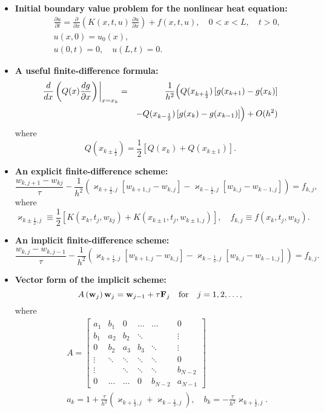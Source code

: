 \documentclass[12pt]{article}
\newcommand\pr{\partial}
\begin{document}
\begin{itemize}

\item \textbf{Initial boundary value problem for the nonlinear heat equation:}
\begin{eqnarray}
&&\frac{\pr u}{\pr t} =\frac{\pr }{\pr x}\left(K(x,t,u) \,
\frac{\pr u}{\pr x}\right)+f(x,t,u),  \quad 0<x< L, \quad t>0, \nonumber \\
&&u(x, 0) = u_{0}(x), \nonumber \\
&&u(0,t)=0, \quad u(L,t)=0.  \nonumber
\end{eqnarray}

\item \textbf{A useful finite-difference formula:}
\begin{eqnarray}
\frac{d }{d x}\left(Q(x)
\frac{d g}{\pr x}\right)\!\biggm\vert_{x=x_{k}} &=& \frac{1}{h^2}
\Bigl(Q(x_{k+\frac{1}{2}})\left[g(x_{k+1})-g(x_{k})\right] \nonumber \\
&&-
Q(x_{k-\frac{1}{2}})\left[g(x_{k})-g(x_{k-1})\right]\Bigr) +O(h^2) \nonumber
\end{eqnarray}
where
\[
Q(x_{k\pm\frac{1}{2}})=\frac{1}{2}\left[Q(x_{k})+Q(x_{k\pm 1})\right].
\]



\item \textbf{An explicit finite-difference scheme:}
\[
\frac{w_{k,j+1}-w_{kj}}{\tau}-
\frac{1}{h^2}
\left(\varkappa_{k+\frac{1}{2},j}\left[w_{k+1,j}-w_{k,j}\right]-
\varkappa_{k-\frac{1}{2},j}\left[w_{k,j}-w_{k-1,j}\right]\right)=
f_{k,j},
\]
where
\[
\varkappa_{k\pm\frac{1}{2},j}\equiv \frac{1}{2}\left[K(x_{k},t_{j},w_{kj})+
K(x_{k\pm 1},t_{j},w_{k\pm 1,j})\right], \quad
f_{k,j}\equiv f(x_{k},t_{j},w_{kj}).
\]

\item \textbf{An implicit finite-difference scheme:}
\[
\frac{w_{k,j}-w_{k,j-1}}{\tau}-
\frac{1}{h^2}
\left(\varkappa_{k+\frac{1}{2},j}\left[w_{k+1,j}-w_{k,j}\right]-
\varkappa_{k-\frac{1}{2},j}\left[w_{k,j}-w_{k-1,j}\right]\right)
=f_{k,j}.
\]


\item \textbf{Vector form of the implicit scheme:}
\[
A\left({\bf w}_{j}\right){\bf w}_{j}={\bf w}_{j-1}+\tau {\bf F}_{j} \quad \hbox{for} \quad j=1,2,\dots,
\]
where
\begin{eqnarray}
&&A=\left[
\begin{array}{cccccc}
a_{1} & b_{1} &0      &\dots  &\dots &0 \\
b_{1} &a_{2} &b_{2} &\ddots  &     &\vdots \\
0      &b_{2} &a_{3} &b_{3} &\ddots &\vdots \\
\vdots &\ddots &\ddots &\ddots &\ddots &0 \\
\vdots &       &\ddots &\ddots &\ddots &b_{N-2} \\
0      &\dots  &\dots  &0      &b_{N-2} &a_{N-1}
\end{array}\right] \nonumber \\
&&a_{k}=1+\frac{\tau}{h^2}(\varkappa_{k+\frac{1}{2},j}+\varkappa_{k-\frac{1}{2},j}), \quad
b_{k}=-\frac{\tau}{h^2}\varkappa_{k+\frac{1}{2},j}.
\nonumber
\end{eqnarray}



\end{itemize}
\end{document}
